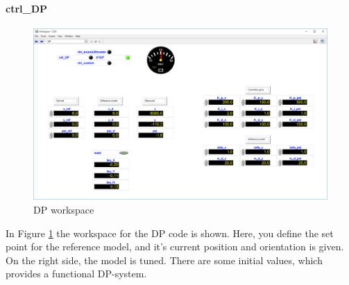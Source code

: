 \paragraph{ctrl\_DP}
\begin{figure}[htb!]
	\centering
	\includegraphics[width=\textwidth]{fig/CSE1_workspace_DP.png}
	\caption{DP workspace}
	\label{fig:workspace_DP}
\end{figure}
In Figure \ref{fig:workspace_DP} the workspace for the DP code is shown. Here, you define the set point for the reference model, and it's current position and orientation is given. On the right side, the model is tuned. There are some initial values, which provides a functional DP-system. 
